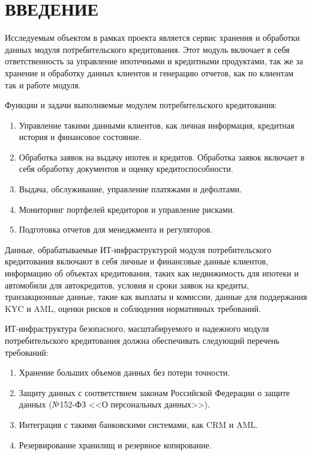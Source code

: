 \documentclass[14pt, a4paper]{extarticle}
\begin{document}
\def\contentsname{СОДЕРЖАНИЕ}

\begin{titlepage}
	
	
\end{titlepage}
\setcounter{page}{7}
\tableofcontents

\section*{ВВЕДЕНИЕ}
{}

Исследуемым объектом в рамках проекта является сервис хранения и обработки
данных модуля потребительского кредитования. Этот модуль включает в
себя ответственность за управление ипотечными и кредитными продуктами, так же
за хранение и обработку данных клиентов и генерацию отчетов, как по клиентам
так и работе модуля.

Функции и задачи выполняемые модулем потребительского кредитования:
\begin{enumerate}
	\item Управление такими данными клиентов, как личная информация, кредитная
	      история и финансовое состояние.
	\item Обработка заявок на выдачу ипотек и кредитов. Обработка заявок включает
	      в себя обработку документов и оценку кредитоспособности.
	\item Выдача, обслуживание, управление платяжами и дефолтами.
	\item Мониторинг портфелей кредиторов и управление рисками.
	\item Подготовка отчетов для менеджмента и регуляторов.
\end{enumerate}

Данные, обрабатываемые ИТ-инфраструктурой модуля потребительского кредитования
включают в себя личные и финансовые данные клиентов, информацию об объектах
кредитования, таких как недвижимость для ипотеки и автомобили для автокредитов,
условия и сроки заявок на кредиты, транзакционные данные, такие как выплаты и
комиссии, данные для поддержания KYC и AML, оценки рисков и соблюдения
нормативных требований.

ИТ-инфраструктура безопасного, масштабируемого и надежного модуля
потребительского кредитования должна обеспечивать следующий перечень
требований:

\begin{enumerate}
	\item Хранение больших объемов данных без потери точности.
	\item Защиту данных с соответствием законам Российской Федерации о защите
	      данных (№152-ФЗ <<О персональных данных>>).
	\item Интеграция с такими банковскими системами, как CRM и AML.
	\item Резервирование хранилищ и резервное копирование.
\end{enumerate}
\end{document}
